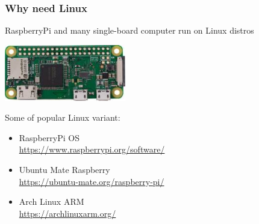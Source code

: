 \documentclass[table,dvipsnames]{beamer}
\begin{document}
	\begin{frame}
		\frametitle{Why need Linux}
		\begin{exampleblock}{}
			RaspberryPi and many single-board computer run on Linux distros
			\begin{center}
				\includegraphics[width=150pt]{images/rpizerow}
			\end{center}
		\end{exampleblock}
		\begin{exampleblock}{}
			Some of popular Linux variant:
			\begin{itemize}
				\item RaspberryPi OS \\
				\url{https://www.raspberrypi.org/software/}
				
				\item Ubuntu Mate Raspberry \\
				\url{https://ubuntu-mate.org/raspberry-pi/}
				
				\item Arch Linux ARM \\
				\url{https://archlinuxarm.org/}
			\end{itemize}
		\end{exampleblock}
		
	\end{frame}
\end{document}
